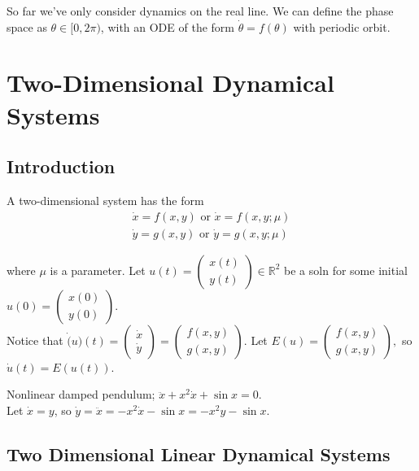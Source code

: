 \documentclass[12pt, oneside]{article}
\begin{document}
So far we've only consider dynamics on the real line. We can define the phase space as $\theta \in [0, 2 \pi)$, with an ODE of the form $\dot{\theta} = f(\theta)$ with periodic orbit.

\section{Two-Dimensional Dynamical Systems}
\subsection{Introduction}
A two-dimensional system has the form 
\begin{align*}
  \dot{x} = f(x,y) \text{ or } \dot{x} = f(x,y;\mu)\\
  \dot{y} = g(x,y) \text{ or }\dot{y} = g(x,y;\mu)
\end{align*}

where $\mu$ is a parameter. Let $u(t) = \begin{pmatrix}
  x(t)\\
  y(t)
\end{pmatrix} \in \mathbb{R}^2$ be a soln for some initial $u(0) = \begin{pmatrix}
  x(0)\\
  y(0)
\end{pmatrix}$.\\
Notice that $\dot(u)(t) = \begin{pmatrix}
  \dot{x}\\
  \dot{y}
\end{pmatrix} = \begin{pmatrix}
  f(x,y)\\
  g(x,y)
\end{pmatrix}$. Let $E(u) = \begin{pmatrix}
  f(x,y)\\
  g(x,y)
\end{pmatrix},$ so $\dot{u}(t) = E(u(t))$.

\begin{example}
  Nonlinear damped pendulum; $\ddot{x} + x^2 \dot{x} + \sin x = 0$.\\
  Let $\dot{x} = y$, so $\dot{y} = \ddot{x} = -x^2 \dot{x} - \sin x = -x^2y-\sin x$.
\end{example}

\subsection{Two Dimensional Linear Dynamical Systems}
\end{document}
